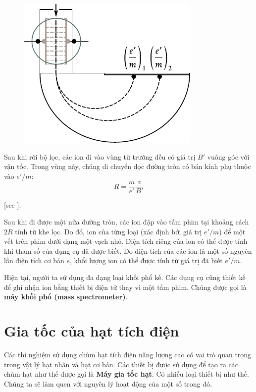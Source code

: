 \begin{figure}[t]
	\begin{center}
		\includegraphics[scale=1]{figures/ch_10/fig_10_13.pdf}
		\caption[]{}
		\label{fig:10_13}
	\end{center}
	\vspace{-0.8cm}
\end{figure}

Sau khi rời bộ lọc, các ion đi vào vùng từ trường đều có giá trị $B'$ vuông góc với vận tốc.
Trong vùng này, chúng di chuyển dọc đường tròn có bán kính phụ thuộc vào $e'/m$:
\begin{equation*}
    R = \frac{m}{e'}\frac{v}{B'}
\end{equation*}

[see ].

Sau khi đi được một nửa đường tròn, các ion đập vào tấm phim tại khoảng cách $2R$ tính từ khe lọc.
Do đó, ion của từng loại (xác định bởi giá trị $e'/m$) để một vết trên phim dưới dạng một vạch nhỏ.
Điện tích riêng của ion có thể được tính khi tham số của dụng cụ đã được biết.
Do điện tích của các ion là một số nguyên lần điện tích cơ bản $e$, khổi lượng ion có thể được tính từ giá trị đã biết $e'/m$.

Hiện tại, người ta sử dụng đa dạng loại khối phổ kế.
Các dụng cụ cũng thiết kế để ghi nhận ion bằng thiết bị điện tử thay vì một tấm phim.
Chúng được gọi là \textbf{máy khối phổ (mass spectrometer)}.

\section{Gia tốc của hạt tích điện}\label{sec:10_5}

Các thí nghiệm sử dụng chùm hạt tích điện năng lượng cao có vai trò quan trọng trong vật lý hạt nhân và hạt cơ bản.
Các thiết bị được sử dụng để tạo ra các chùm hạt như thế được gọi là \textbf{Máy gia tốc hạt}.
Có nhiều loại thiết bị như thế.
Chúng ta sẽ làm quen với nguyên lý hoạt động của một số trong đó.

